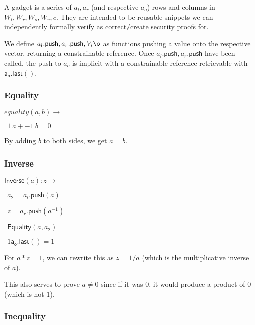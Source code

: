 \documentclass[]{article}
\begin{document}
A gadget is a series of $a_l, a_r$ (and respective $a_o$) rows and columns in $W_l, W_r, W_o, W_v, c$. They are intended to be reusable snippets we can independently formally verify as correct/create security proofs for.

\newcommand{\p}{\mathsf{.push}}
\newcommand{\al}{a_l\p}
\newcommand{\ar}{a_r\p}
\newcommand{\aol}{\mathsf{a_o.last()}}

We define $\al, \ar, V_i\o$ as functions pushing a value onto the respective vector, returning a constrainable reference. Once $\al, \ar$ have been called, the push to $a_o$ is implicit with a constrainable reference retrievable with $\aol$.

\newcommand{\all}{\mathsf{a_l.last()}}
\newcommand{\arl}{\mathsf{a_r.last()}}

\newpage

\subsubsection{Equality}

\newcommand{\equality}{\mathsf{Equality}}

$equality(a, b) \rightarrow$

$~~1 ~a + -1 ~b = 0$

By adding $b$ to both sides, we get $a = b$.

\subsubsection{Inverse}

\newcommand{\inverse}{\mathsf{Inverse}}

$\inverse(a): z \rightarrow$

$~~a_2 = \al(a)$

$~~z = \ar(a^{-1})$

$~~\equality(a, a_2)$

$~~1 \aol = 1$

For $a * z = 1$, we can rewrite this as $z = 1/a$ (which is the multiplicative inverse of $a$).

This also serves to prove $a \ne 0$ since if it was $0$, it would produce a product of $0$ (which is not $1$).

\subsubsection{Inequality}

\newcommand{\inequality}{\mathsf{Inequality}}
\end{document}
